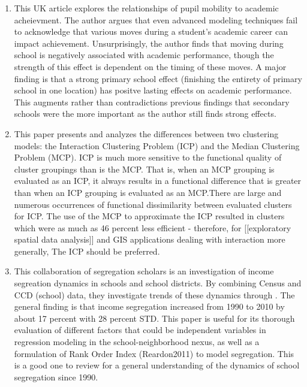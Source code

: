 \documentclass{article}
\begin{document}
\begin{enumerate}
\item \cite{leckie2009ComplexitySchool} This UK article explores the
  relationships of pupil mobility to academic acheievment. The author
  argues that even advanced modeling techniques fail to acknowledge
  that various moves during a student's academic career can impact
  achievement. Unsurprisingly, the author finds that moving during
  school is negatively associated with academic performance, though
  the strength of this effect is dependent on the timing of these
  moves. A major finding is that a strong primary school effect
  (finishing the entirety of primary school in one location) has
  positve lasting effects on academic performance. This augments
  rather than contradictions previous findings that secondary schools
  were the more important as the author still finds strong effects.

\item \cite{murray2000SpatialCharacteristics} This paper presents and
  analyzes the differences between two clustering models: the
  Interaction Clustering Problem (ICP) and the Median Clustering
  Problem (MCP). ICP is much more sensitive to the functional quality
  of cluster groupings than is the MCP. That is, when an MCP grouping
  is evaluated as an ICP, it always results in a functional difference
  that is greater than when an ICP grouping is evaluated as an
  MCP.There are large and numerous occurrences of functional
  dissimilarity between evaluated clusters for ICP. The use of the MCP
  to approximate the ICP resulted in clusters which were as much as 46
  percent less efficient - therefore, for [[exploratory spatial data
      analysis]] and GIS applications dealing with interaction more
  generally, The ICP should be preferred.

\item \cite{owens2016IncomeSegregation} This collaboration of
  segregation scholars is an investigation of income segreation
  dynamics in schools and school districts. By combining Census and
  CCD (school) data, they investigate trends of these dynamics through
  . The general finding is that income segregation increased from 1990
  to 2010 by about 17 percent with 28 percent STD. This paper is
  useful for its thorough evaluation of different factors that could
  be independent variables in regression modeling in the
  school-neighborhood nexus, as well as a formulation of Rank Order
  Index (Reardon2011) to model segregation. This is a good one to
  review for a general understanding of the dynamics of school
  segregation since 1990.


\end{enumerate}
\end{document}
